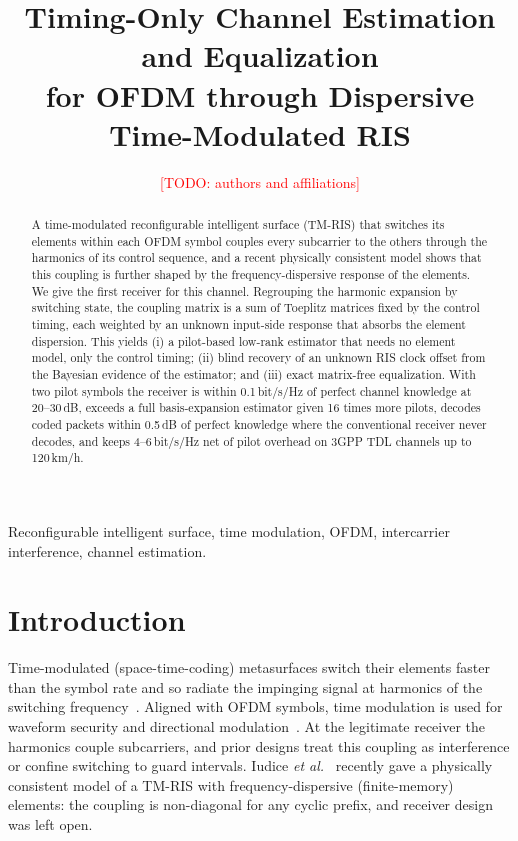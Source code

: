 \documentclass[journal]{IEEEtran}
\newcommand{\TODO}[1]{\textcolor{red}{[TODO: #1]}}
\begin{document}
\title{Timing-Only Channel Estimation and Equalization\\ for OFDM through Dispersive Time-Modulated RIS}
\author{\TODO{authors and affiliations}}
\maketitle

\begin{abstract}
A time-modulated reconfigurable intelligent surface (TM-RIS) that switches its
elements within each OFDM symbol couples every subcarrier to the others through
the harmonics of its control sequence, and a recent physically consistent model
shows that this coupling is further shaped by the frequency-dispersive response
of the elements. We give the first receiver for this channel. Regrouping the
harmonic expansion by switching state, the coupling matrix is a sum of Toeplitz
matrices fixed by the control timing, each weighted by an unknown input-side
response that absorbs the element dispersion. This yields (i) a pilot-based
low-rank estimator that needs no element model, only the control timing;
(ii) blind recovery of an unknown RIS clock offset from the Bayesian evidence of
the estimator; and (iii) exact matrix-free equalization. With two pilot symbols
the receiver is within 0.1\,bit/s/Hz of perfect channel knowledge at 20--30\,dB,
exceeds a full basis-expansion estimator given 16 times more pilots, decodes
coded packets within 0.5\,dB of perfect knowledge where the conventional
receiver never decodes, and keeps 4--6\,bit/s/Hz net of pilot overhead on 3GPP
TDL channels up to 120\,km/h.
\end{abstract}

\begin{IEEEkeywords}
Reconfigurable intelligent surface, time modulation, OFDM, intercarrier interference, channel estimation.
\end{IEEEkeywords}

\section{Introduction}
Time-modulated (space-time-coding) metasurfaces switch their elements faster
than the symbol rate and so radiate the impinging signal at harmonics of the
switching frequency~\cite{zhang2018}. Aligned with OFDM symbols, time
modulation is used for waveform security and directional
modulation~\cite{xu2023tmirs,wang2026generative}. At the legitimate receiver
the harmonics couple subcarriers, and prior designs treat this coupling as
interference or confine switching to guard intervals. Iudice
\emph{et al.}~\cite{iudice2026} recently gave a physically consistent model of a
TM-RIS with frequency-dispersive (finite-memory) elements: the coupling is
non-diagonal for any cyclic prefix, and receiver design was left open.
\end{document}
